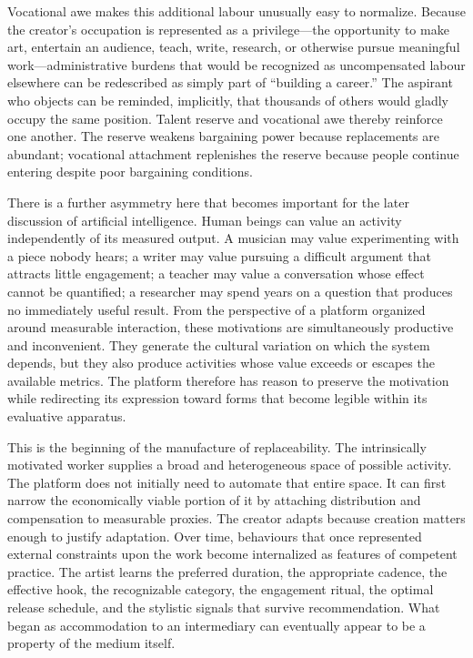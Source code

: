 \documentclass[11pt]{article}
\begin{document}
Vocational awe makes this additional labour unusually easy to normalize. Because the creator's occupation is represented as a privilege---the opportunity to make art, entertain an audience, teach, write, research, or otherwise pursue meaningful work---administrative burdens that would be recognized as uncompensated labour elsewhere can be redescribed as simply part of ``building a career.'' The aspirant who objects can be reminded, implicitly, that thousands of others would gladly occupy the same position. Talent reserve and vocational awe thereby reinforce one another. The reserve weakens bargaining power because replacements are abundant; vocational attachment replenishes the reserve because people continue entering despite poor bargaining conditions.

There is a further asymmetry here that becomes important for the later discussion of artificial intelligence. Human beings can value an activity independently of its measured output. A musician may value experimenting with a piece nobody hears; a writer may value pursuing a difficult argument that attracts little engagement; a teacher may value a conversation whose effect cannot be quantified; a researcher may spend years on a question that produces no immediately useful result. From the perspective of a platform organized around measurable interaction, these motivations are simultaneously productive and inconvenient. They generate the cultural variation on which the system depends, but they also produce activities whose value exceeds or escapes the available metrics. The platform therefore has reason to preserve the motivation while redirecting its expression toward forms that become legible within its evaluative apparatus.

This is the beginning of the manufacture of replaceability. The intrinsically motivated worker supplies a broad and heterogeneous space of possible activity. The platform does not initially need to automate that entire space. It can first narrow the economically viable portion of it by attaching distribution and compensation to measurable proxies. The creator adapts because creation matters enough to justify adaptation. Over time, behaviours that once represented external constraints upon the work become internalized as features of competent practice. The artist learns the preferred duration, the appropriate cadence, the effective hook, the recognizable category, the engagement ritual, the optimal release schedule, and the stylistic signals that survive recommendation. What began as accommodation to an intermediary can eventually appear to be a property of the medium itself.
\end{document}

